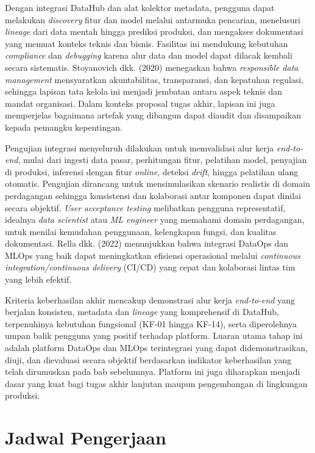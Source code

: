 Dengan integrasi DataHub dan alat kolektor metadata, pengguna dapat melakukan \textit{discovery} fitur dan model melalui antarmuka pencarian, menelusuri \textit{lineage} dari data mentah hingga prediksi produksi, dan mengakses dokumentasi yang memuat konteks teknis dan bisnis. Fasilitas ini mendukung kebutuhan \textit{compliance} dan \textit{debugging} karena alur data dan model dapat dilacak kembali secara sistematis. Stoyanovich dkk. (2020) menegaskan bahwa \textit{responsible data management} mensyaratkan akuntabilitas, transparansi, dan kepatuhan regulasi, sehingga lapisan tata kelola ini menjadi jembatan antara aspek teknis dan mandat organisasi. Dalam konteks proposal tugas akhir, lapisan ini juga memperjelas bagaimana artefak yang dibangun dapat diaudit dan disampaikan kepada pemangku kepentingan.

Pengujian integrasi menyeluruh dilakukan untuk memvalidasi alur kerja \textit{end-to-end}, mulai dari ingesti data pasar, perhitungan fitur, pelatihan model, penyajian di produksi, inferensi dengan fitur \textit{online}, deteksi \textit{drift}, hingga pelatihan ulang otomatis. Pengujian dirancang untuk mensimulasikan skenario realistis di domain perdagangan sehingga konsistensi dan kolaborasi antar komponen dapat dinilai secara objektif. \textit{User acceptance testing} melibatkan pengguna representatif, idealnya \textit{data scientist} atau \textit{ML engineer} yang memahami domain perdagangan, untuk menilai kemudahan penggunaan, kelengkapan fungsi, dan kualitas dokumentasi. Rella dkk. (2022) menunjukkan bahwa integrasi DataOps dan MLOps yang baik dapat meningkatkan efisiensi operasional melalui \textit{continuous integration/continuous delivery} (CI/CD) yang cepat dan kolaborasi lintas tim yang lebih efektif.

Kriteria keberhasilan akhir mencakup demonstrasi alur kerja \textit{end-to-end} yang berjalan konsisten, metadata dan \textit{lineage} yang komprehensif di DataHub, terpenuhinya kebutuhan fungsional (KF-01 hingga KF-14), serta diperolehnya umpan balik pengguna yang positif terhadap platform. Luaran utama tahap ini adalah platform DataOps dan MLOps terintegrasi yang dapat didemonstrasikan, diuji, dan dievaluasi secara objektif berdasarkan indikator keberhasilan yang telah dirumuskan pada bab sebelumnya. Platform ini juga diharapkan menjadi dasar yang kuat bagi tugas akhir lanjutan maupun pengembangan di lingkungan produksi.

\section{Jadwal Pengerjaan}

